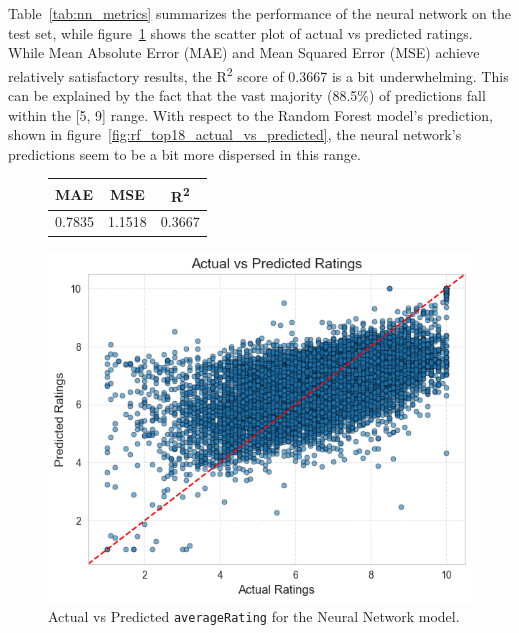 Table~\ref{tab:nn_metrics} summarizes the performance of the
neural network on the test set,
while figure~\ref{fig:nn_actual_vs_predicted} shows the scatter
plot of actual vs predicted ratings.
While Mean Absolute Error (MAE) and Mean Squared Error (MSE) achieve
relatively satisfactory results, the R\textsuperscript{2} score of
0.3667 is a bit underwhelming. This can be explained by the fact
that the vast majority (88.5\%) of predictions fall within the
[5, 9] range. With respect to the Random Forest model's prediction,
shown in figure~\ref{fig:rf_top18_actual_vs_predicted},
the neural network's predictions seem to be a bit more dispersed
in this range.

\begin{figure}[H]
    \centering
    \begin{minipage}{0.4\textwidth}
        \centering
        \begin{tabular}{lcc}
            \hline
            \textbf{MAE} & \textbf{MSE} & \textbf{R\textsuperscript{2}} \\
            \hline
            0.7835 & 1.1518 & 0.3667 \\
            \hline
        \end{tabular}
        \label{tab:nn_metrics}
    \end{minipage}
    \hfill
    \begin{minipage}{0.55\textwidth}
        \centering
        \includegraphics[width=1\textwidth]{plotsss/preds_reg_nn.png}
        \caption{Actual vs Predicted \texttt{averageRating} for the Neural Network model.}
        \label{fig:nn_actual_vs_predicted}
    \end{minipage}
\end{figure}